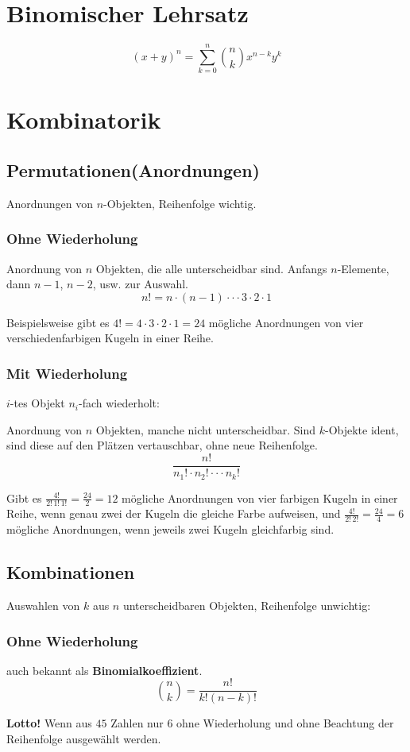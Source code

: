\section{Binomischer Lehrsatz}\label{sec:binom_lehrsatz}
\[(x+y)^n=\sum_{k=0}^n\binom{n}{k}x^{n-k}y^k\]
\section{Kombinatorik}
\subsection{Permutationen(Anordnungen)}
Anordnungen von $n$-Objekten, Reihenfolge wichtig.
\subsubsection{Ohne Wiederholung}
Anordnung von $n$ Objekten, die alle unterscheidbar sind.
Anfangs $n$-Elemente, dann $n-1$, $n-2$, usw. zur Auswahl.
\[n!=n\cdot(n-1)\cdot\cdot\cdot3\cdot2\cdot1\]
\begin{bsp}
Beispielsweise gibt es $4!=4\cdot 3\cdot 2\cdot 1=24$ mögliche Anordnungen von vier verschiedenfarbigen Kugeln in einer Reihe.
\end{bsp}
\subsubsection{Mit Wiederholung}
$i$-tes Objekt $n_i$-fach wiederholt:

Anordnung von $n$ Objekten, manche nicht unterscheidbar. Sind $k$-Objekte ident, sind diese auf den Plätzen vertauschbar, ohne neue Reihenfolge.
\[\frac{n!}{n_1!\cdot n_2!\cdot\cdot\cdot n_k!}\]
\begin{bsp}
Gibt es $\tfrac {4!}{2!\,1!\,1!}={\tfrac {24}{2}}=12$ mögliche Anordnungen von vier 
farbigen Kugeln in einer Reihe, wenn genau zwei der Kugeln die gleiche Farbe 
aufweisen, und ${\tfrac {4!}{2!\,2!}}={\tfrac {24}{4}}=6$ mögliche Anordnungen, 
wenn jeweils zwei Kugeln gleichfarbig sind.
\end{bsp}
\subsection{Kombinationen}
Auswahlen von $k$ aus $n$ unterscheidbaren Objekten, Reihenfolge unwichtig:
\subsubsection{Ohne Wiederholung}\label{sec:binomialkoeffizient}
auch bekannt als \textbf{Binomialkoeffizient}.
\[\binom{n}{k}=\frac{n!}{k!(n-k)!}\]
\begin{bsp}
    \textbf{Lotto!}
    Wenn aus $45$ Zahlen nur $6$ ohne Wiederholung und ohne Beachtung der Reihenfolge ausgewählt werden. 
\end{bsp}
